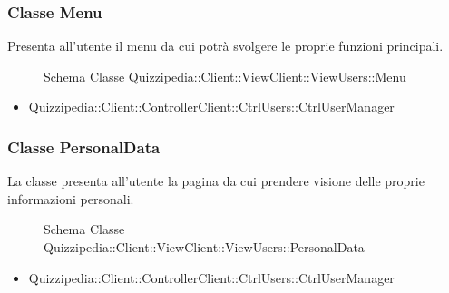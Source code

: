 \subsubsection{Classe Menu}
Presenta all'utente il menu da cui potrà svolgere le proprie funzioni principali.
\begin{figure}[H]
\centering
\noindent{}
\caption{Schema Classe Quizzipedia::Client::ViewClient::ViewUsers::Menu}
\end{figure}
\begin{itemize}
\item Quizzipedia::Client::ControllerClient::CtrlUsers::CtrlUserManager
\end{itemize}
\subsubsection{Classe PersonalData}
La classe presenta all'utente la pagina da cui prendere visione delle proprie informazioni personali.
\begin{figure}[H]
\centering
\noindent{}
\caption{Schema Classe Quizzipedia::Client::ViewClient::ViewUsers::PersonalData}
\end{figure}
\begin{itemize}
\item Quizzipedia::Client::ControllerClient::CtrlUsers::CtrlUserManager
\end{itemize}
